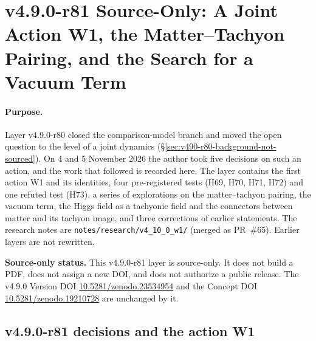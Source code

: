 
\clearpage
\section*{v4.9.0-r81 Source-Only: A Joint Action W1, the Matter--Tachyon Pairing, and the Search for a Vacuum Term}
\label{sec:v490-r81-joint-action-w1}

\paragraph{Purpose.}
Layer v4.9.0-r80 closed the comparison-model branch and moved the open question to the level of a joint dynamics
(\S\ref{sec:v490-r80-background-not-sourced}).  On 4 and 5 November 2026 the author took five decisions on such an action, and the
work that followed is recorded here.  The layer contains the first action W1 and its identities, four pre-registered tests (H69,
H70, H71, H72) and one refuted test (H73), a series of explorations on the matter--tachyon pairing, the vacuum term, the Higgs
field as a tachyonic field and the connectors between matter and its tachyon image, and three corrections of earlier statements.
The research notes are \texttt{notes/\allowbreak research/\allowbreak v4\_10\_0\_w1/} (merged as PR~\#65).  Earlier layers are
not rewritten.

\noindent\textbf{Source-only status.}
This v4.9.0-r81 layer is source-only.  It does not build a PDF, does not assign a new DOI,
and does not authorize a public release.  The v4.9.0 Version DOI
\href{https://doi.org/10.5281/zenodo.23534954}{10.5281/zenodo.23534954} and the Concept DOI
\href{https://doi.org/10.5281/zenodo.19210728}{10.5281/zenodo.19210728} are unchanged by it.

\subsection*{v4.9.0-r81 decisions and the action W1}
\label{subsec:v490-r81-action}

